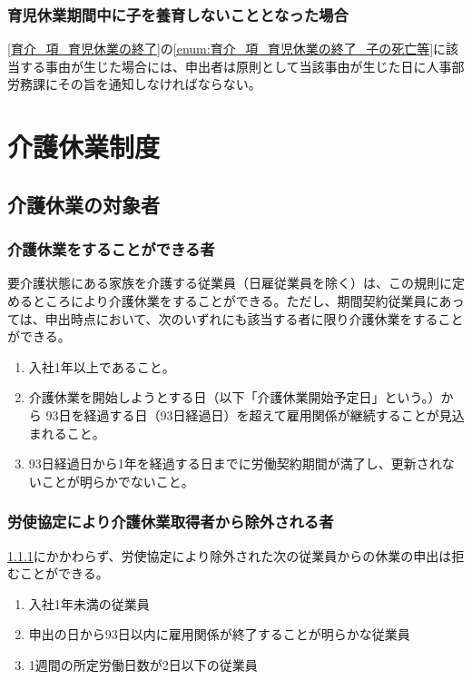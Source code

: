 \documentclass{jsarticle}
\begin{document}
\subsubsection{育児休業期間中に子を養育しないこととなった場合}
\label{育介_項_育児休業期間中に子を養育しないこととなった場合}
\ref{育介_項_育児休業の終了}の\ref{enum:育介_項_育児休業の終了_子の死亡等}に該当する事由が生じた場合には、申出者は原則として当該事由が生じた日に人事部労務課にその旨を通知しなければならない。 

\section{介護休業制度}

\subsection{介護休業の対象者}
\label{育介_条_介護休業の対象者}

\subsubsection{介護休業をすることができる者}
\label{育介_項_介護休業をすることができる者}
要介護状態にある家族を介護する従業員（日雇従業員を除く）は、この規則に定めるところにより介護休業をすることができる。ただし、期間契約従業員にあっては、申出時点において、次のいずれにも該当する者に限り介護休業をすることができる。
\begin{enumerate}
  \item 入社1年以上であること。
  \item 介護休業を開始しようとする日（以下「介護休業開始予定日」という。）から 93日を経過する日（93日経過日）を超えて雇用関係が継続することが見込まれること。
  \item 93日経過日から1年を経過する日までに労働契約期間が満了し、更新されないことが明らかでないこと。 
\end{enumerate}

\subsubsection{労使協定により介護休業取得者から除外される者}
\label{育介_項_労使協定により介護休業取得者から除外される者}
\ref{育介_項_介護休業をすることができる者}にかかわらず、労使協定により除外された次の従業員からの休業の申出は拒むことができる。
\begin{enumerate}
  \item 入社1年未満の従業員
  \item 申出の日から93日以内に雇用関係が終了することが明らかな従業員
  \item 1週間の所定労働日数が2日以下の従業員
\end{enumerate}
\end{document}
